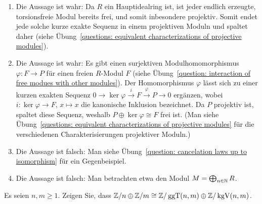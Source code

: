 \begin{solution}
\begin{enumerate}
    \item
      Die Aussage ist wahr:
      Da $R$ ein Hauptidealring ist, ist jeder endlich erzeugte, torsionsfreie Modul bereits frei, und somit inbesondere projektiv.
      Somit endet jede solche kurze exakte Sequenz in einem projektiven Moduln und spaltet daher (siehe Übung~\ref{questions: equivalent characterizations of projective modules}).
    
    \item
      Die Aussage ist wahr:
      Es gibt einen surjektiven Modulhomomorphismus $\varphi \colon F \to P$ für einen freien $R$-Modul $F$ (siehe Übung~\ref{question: interaction of free modues with other modules}).
      Der Homomorphismus $\varphi$ lässt sich zu einer kurzen exakten Sequenz $0 \to \ker \varphi \xrightarrow{i} F \xrightarrow{\varphi} P \to 0$ ergänzen, wobei $i \colon \ker \varphi \to F$, $x \mapsto x$ die kanonische Inklusion bezeichnet.
      Da $P$ projektiv ist, spaltet diese Sequenz, weshalb $P \oplus \ker \varphi \cong F$ frei ist.
      (Man siehe Übung~\ref{questions: equivalent characterizations of projective modules} für die verschiedenen Charakterisierungen projektiver Moduln.)
      
    \item
      Die Aussage ist falsch:
      Man siehe Übung~\ref{question: cancelation laws up to isomorphism} für ein Gegenbeispiel.
      
    \item
      Die Aussage ist falsch:
      Man betrachten etwa den Modul $M = \bigoplus_{n \in \mathbb{N}} R$.
  \end{enumerate}
\end{solution}


\begin{question}
  Es seien $n, m \geq 1$.
  Zeigen Sie, dass $\mathbb{Z}/n \oplus \mathbb{Z}/m \cong \mathbb{Z}/\operatorname{ggT}(n,m) \oplus \mathbb{Z}/\operatorname{kgV}(n,m)$.
\end{question}


